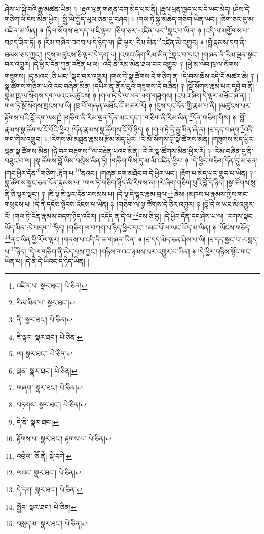 ཤེས་པ་སྐྱེ་བའི་རྒྱུ་མཚན་ཡིན། ༈ །རྡུལ་ཕྲན་གཞན་དག་མེད་པར་ནི། །རྡུལ་ཕྲན་ཁྱད་པར་དེ་ཡང་མེད། །ཤེས་དེ་གཅིག་ལ་ངེས་མིན་ཕྱིར། །སྤྱི་ཡི་སྤྱོད་ཡུལ་ཅན་དུ་བཤད། ༈ །གལ་ཏེ་སྐྱེ་མཆེད་གཅིག་ཡིན་ཡང་། །ཅིག་ཅར་དུ་མ་འཛིན་མ་ཡིན། ༈ །ཏིལ་སོགས་ཐ་དད་ལ་ཇི་ལྟར། །ཅིག་ཅར་:འཛིན་པར་\footnote{འཛིན་པ་  སྣར་ཐང་།  པེ་ཅིན། }སྣང་བ་ཡིན། ༈ །འདི་ལ་མགྱོགས་པ་བཤད་ཟིན་ཏོ། ༈ །རིམ་བཞིན་འབབ་པ་དེ་ཉིད་ལ། །ཇི་ལྟར་:རིམ་མིན་\footnote{རིམ་མིན་པ་  སྣར་ཐང་། }འཛིན་མི་འགྱུར། ༈ །བློ་རྣམས་དག་ནི་ཐམས་ཅད་ཀྱང་། །དུས་མཚུངས་ཅི་ལྟར་དེ་དག་ལ། །འགའ་ཞིག་རིམ་མིན་\footnote{ནི་  སྣར་ཐང་།  པེ་ཅིན། }སྣང་བ་དང་། །གཞན་ནི་རིམ་ལྡན་སྣང་བར་འགྱུར། །དེ་ཕྱིར་དོན་ཀུན་འཛིན་པ་ལ། །འདི་ནི་རིམ་མིན་ཐལ་བར་འགྱུར། ༈ །ཕྱེ་མ་ལེབ་ཁྲ་ལ་སོགས་གཟུགས། །དུ་མའང་:ཅི་ཡང་\footnote{ཇི་ལྟར་  སྣར་ཐང་།  པེ་ཅིན། }སྣང་བར་འགྱུར། །གལ་ཏེ་སྣ་ཚོགས་དེ་གཅིག་ན། །དེ་བས་ཆོས་འདི་ངོ་མཚར་ཆེ། ༈ །སྣ་ཚོགས་གཅིག་པའི་རང་བཞིན་མིན། །དཔེར་ན་ནོར་བུའི་གཟུགས་དེ་བཞིན། ༈ །སྔོ་སོགས་རྣམ་པར་དབྱེ་བ་ནི། །སྣམ་ཁྲ་ལ་སོགས་དག་ལའང་མཚུངས། ༈ །གལ་ཏེ་དེ་ལ་ཡན་ལག་གཟུགས། །འབའ་ཞིག་དེ་ལྟར་མཐོང་ཞེ་ན། །གལ་ཏེ་སྔོ་སོགས་སྤངས་པ་ཡི། །ཁྲ་བོ་གཞན་མཐོང་ངོ་མཚར་རོ། ༈ །དུས་དང་དོན་གྱི་རྣམ་པ་ནི། །མཚུངས་པར་རྟོགས་པའི་བློ་དག་ལས།\footnote{ལ།  སྣར་ཐང་།  པེ་ཅིན། } །གཅིག་ནི་རིམ་ལྡན་དོན་མང་དང་། །གཅིག་ནི་རིམ་མིན་\footnote{ལྡན་  སྣར་ཐང་།  པེ་ཅིན། }དོན་གཅིག་གིས། ༈ །བློ་རྣམས་སྣ་ཚོགས་ངོ་བོའི་ཕྱིར། །དོན་རྣམས་སྣ་ཚོགས་ངོ་བོ་ཉིད། ༈ །གལ་ཏེ་དེ་རྒྱུ་མིན་ཞེ་ན། །ཐ་དད་བཞག་\footnote{གཞག་  སྣར་ཐང་།  པེ་ཅིན། }འདི་གང་གིས་འགྲུབ། ༈ །རིགས་མི་མཐུན་རྣམས་རྩོམ་མེད་ཕྱིར། །རི་མོ་སོགས་བློ་སྣ་ཚོགས་མིན། །གཟུགས་མེད་ཕྱིར་ལྡན་སྣ་ཚོགས་མིན། །ཉེ་བར་བརྟགས་\footnote{བཏགས་  སྣར་ཐང་།  པེ་ཅིན། }ལ་བརྟེན་པའང་མིན། །རེ་རེ་སྣ་ཚོགས་མིན་ཕྱིར་རོ། ༈ །རིམ་བཞིན་དུ་ནི་བཟུང་བ་ལ། །སྣ་ཚོགས་བློ་ཡིས་བསྲེས་མིན་ཏེ། །གཅིག་གིས་དུ་མ་མི་འཛིན་ཕྱིར། ༈ །དེ་ཕྱིར་གཅིག་དོན་དུ་མ་ཅན། །གང་ཕྱིར་དོན་\footnote{དེ་ནི་  སྣར་ཐང་། }གཅིག་:རྟོག་པ་\footnote{རྟོགས་པ་  སྣར་ཐང་། རྟགས་པ་  པེ་ཅིན། }ནའང་། །གཞན་དག་མཐོང་བ་དེ་ཕྱིར་ཡང་། །རྟོག་པ་མེད་པར་གྲུབ་པ་ཡིན། ༈ །སྣ་ཚོགས་སྣང་ཅན་དོན་རྣམས་ལ། །གལ་ཏེ་གཅིག་ཉིད་མི་རིགས་ན། །རེ་ཞིག་གཅིག་པུའི་བློ་དེ་ཉིད། །སྣ་ཚོགས་སུ་ནི་ཅི་ལྟར་སྣང་། ༈ །ཇི་ལྟ་ཇི་ལྟར་དོན་བསམས་པ། །དེ་ལྟ་དེ་ལྟར་རྣམ་བྲལ་\footnote{འབྲེལ་  ཅོ་ནེ།  སྡེ་དགེ། }ཞེས། །མཁས་པ་རྣམས་ཀྱིས་གང་གསུངས་པ། །དེ་ནི་དངོས་སྟོབས་འོངས་པ་ཡིན། ༈ །གཅིག་ལ་སྣ་ཚོགས་དེ་ཅིར་འགྱུར། ༈ །བློ་དེ་ལ་ཡང་མི་འགྱུར་རོ། །གལ་ཏེ་དོན་རྣམས་བདག་ཉིད་འདིར། །འདོད་ན་དེ་ལ་\footnote{ལའང་  སྣར་ཐང་།  པེ་ཅིན། }ངས་ཅི་བྱ། །དེ་ཕྱིར་དོན་དང་ཤེས་པ་ལ། །རགས་སྣང་ཡོད་མིན་:དེ་བདག་\footnote{དེ་དག་  སྣར་ཐང་།  པེ་ཅིན། }ཉིད། །གཅིག་ལ་བཀག་པ་ཉིད་ཕྱིར་དང་། །མང་པོ་ལ་ཡང་ཡོད་མ་ཡིན། ༈ །ཡོངས་གཅོད་\footnote{སྤྱོད་  སྣར་ཐང་།  པེ་ཅིན། }ནང་ཡིན་ཕྱི་རོལ་ལྟར། །གནས་པ་འདི་ནི་ཆ་གཞན་ཡིན། ༈ །ཐ་དད་མེད་ཅན་ཤེས་པ་ཡི། །ཐ་དད་སྣང་བ་:བསླད་པ་\footnote{བསླད་མ་  སྣར་ཐང་།  པེ་ཅིན། }ཉིད། །དེ་ལ་གཅིག་ནི་མེད་པས་ཀྱང་། །གཉིས་ཀའང་ཉམས་པར་འགྱུར་བ་ཡིན། ༈ །དེ་ཕྱིར་གཉིས་སྟོང་གང་ཡིན་པ། །དེ་ནི་དེ་ཡིའང་དེ་ཉིད་ཡིན། །

